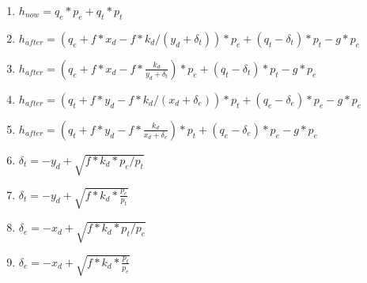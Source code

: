 \documentclass{article}
\begin{document}
\begin{enumerate}

\item $h_{now} = q_{e} \ast p_{e} + q_{t} \ast p_{t}$

\item $h_{after} = (q_{e} + f \ast x_{d}-f \ast k_d/(y_{d}+\delta_{t})) \ast p_{e} + (q_{t}-\delta_{t}) \ast p_{t} - g \ast p_e$

\item $h_{after} = \left( q_{e} + f \ast x_{d}-f \ast \frac{k_d}{y_{d}+\delta_{t}} \right) \ast p_{e} + \left( q_{t}-\delta_{t} \right) \ast p_{t} - g \ast p_e$

\item $h_{after} = (q_{t} + f \ast y_{d}-f \ast k_d/(x_{d}+\delta_{e})) \ast p_{t} + (q_{e}-\delta_{e}) \ast p_{e} - g \ast p_e$

\item $h_{after} = \left( q_{t} + f \ast y_{d}-f \ast \frac{k_d}{x_{d}+\delta_{e}} \right) \ast p_{t} + \left( q_{e}-\delta_{e} \right) \ast p_{e} - g \ast p_e$

\item $\delta_{t}=-y_d + \sqrt{f \ast k_d \ast p_e/p_t}$

\item $\delta_{t}=-y_d + \sqrt{f \ast k_d \ast \frac{p_e}{p_t}}$

\item $\delta_{e}=-x_d + \sqrt{f \ast k_d \ast p_t/p_e}$

\item $\delta_{e}=-x_d + \sqrt{f \ast k_d \ast \frac{p_t}{p_e}}$

\end{enumerate}
\end{document}
